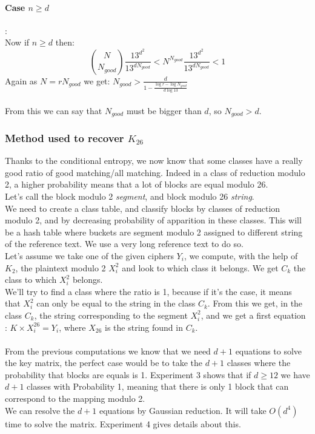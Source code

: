 \documentclass{article}
\begin{document}
\paragraph{Case $n \geq d$}:\\

Now if $n \geq d$ then: 
$${N \choose N_{good}} \frac{13^{d^{2}}}{13^{d N_{good}}} <  N^{N_{good}} \frac{13^{d^{2}}}{13^{d N_{good}}} < 1$$
Again as $N = r N_{good}$ we get: $N_{good} > \frac{d}{1-\frac{\log r -\log N_{good}}{d \log 13}}$\\
\\
From this we can say that $N_{good}$ must be bigger than $d$, so $N_{good} > d$.\\
\subsubsection{Method used to recover $K_{26}$}
Thanks to the conditional entropy, we now know that some classes have a really good ratio of good matching/all matching. Indeed in a class of reduction modulo 2, a higher probability means that a lot of blocks are equal modulo 26.\\
Let's call the block modulo 2 \textit{segment}, and block modulo 26 \textit{string}.\\
We need to create a class table, and classify blocks by classes of reduction modulo 2, and by decreasing probability of apparition in these classes. This will be a hash table where buckets are segment modulo 2 assigned to different string of the reference text. We use a very long reference text to do so.\\
Let's assume we take one of the given ciphers $Y_i$, we compute, with the help of $ K_{2} $, the plaintext modulo 2 $X^{2}_i$ and look to which class it belongs. We get $C_k$ the class to which $X^{2}_{i}$ belongs.\\
We'll try to find a class where the ratio is 1, because if it's the case, it means that $X^{2}_{i}$ can only be equal to the string in the class $C_k$. From this we get, in the class $C_{k}$, the string corresponding to the segment $X^{2}_i$, and we get a first equation : $K \times X_{i}^{26} = Y_{i}$, where $X_{26}$ is the string found in $C_k$.\\
\\
From the previous computations we know that we need $d+1$ equations to solve the key matrix, the perfect case would be to take the $d+1$ classes where the probability that blocks are equals is 1. Experiment 3 shows that if $d \geq 12$ we have $ d+1$ classes with Probability 1, meaning that there is only 1 block that can correspond to the mapping modulo 2.\\
We can resolve the $d+1$ equations by Gaussian reduction. It will take $O(d^4)$ time to solve the matrix. Experiment 4 gives details about this.\\
\\
\end{document}
